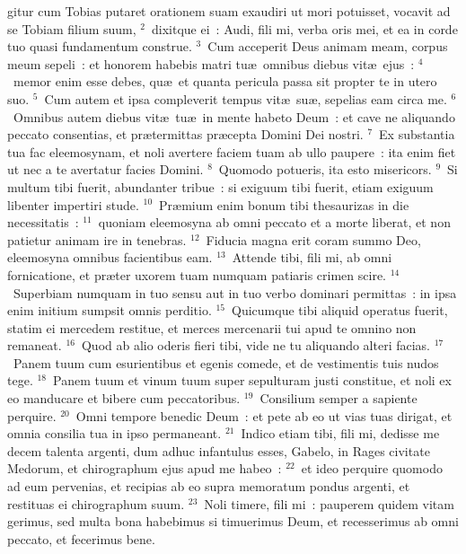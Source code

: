 \bchapter
{}gitur cum Tobias putaret orationem suam exaudiri ut mori potuisset, vocavit ad se Tobiam filium suum,
${}^{2}$~dixitque ei~: Audi, fili mi, verba oris mei, et ea in corde tuo quasi fundamentum construe.
${}^{3}$~Cum acceperit Deus animam meam, corpus meum sepeli~: et honorem habebis matri tu\ae\ omnibus diebus vit\ae\ ejus~:
${}^{4}$~memor enim esse debes, qu\ae\ et quanta pericula passa sit propter te in utero suo.
${}^{5}$~Cum autem et ipsa compleverit tempus vit\ae\ su\ae , sepelias eam circa me.
${}^{6}$~Omnibus autem diebus vit\ae\ tu\ae\ in mente habeto Deum~: et cave ne aliquando peccato consentias, et pr\ae termittas pr\ae cepta Domini Dei nostri.
${}^{7}$~Ex substantia tua fac eleemosynam, et noli avertere faciem tuam ab ullo paupere~: ita enim fiet ut nec a te avertatur facies Domini.
${}^{8}$~Quomodo potueris, ita esto misericors.
${}^{9}$~Si multum tibi fuerit, abundanter tribue~: si exiguum tibi fuerit, etiam exiguum libenter impertiri stude.
${}^{10}$~Pr\ae mium enim bonum tibi thesaurizas in die necessitatis~:
${}^{11}$~quoniam eleemosyna ab omni peccato et a morte liberat, et non patietur animam ire in tenebras.
${}^{12}$~Fiducia magna erit coram summo Deo, eleemosyna omnibus facientibus eam.
${}^{13}$~Attende tibi, fili mi, ab omni fornicatione, et pr\ae ter uxorem tuam numquam patiaris crimen scire.
${}^{14}$~Superbiam numquam in tuo sensu aut in tuo verbo dominari permittas~: in ipsa enim initium sumpsit omnis perditio.
${}^{15}$~Quicumque tibi aliquid operatus fuerit, statim ei mercedem restitue, et merces mercenarii tui apud te omnino non remaneat.
${}^{16}$~Quod ab alio oderis fieri tibi, vide ne tu aliquando alteri facias.
${}^{17}$~Panem tuum cum esurientibus et egenis comede, et de vestimentis tuis nudos tege.
${}^{18}$~Panem tuum et vinum tuum super sepulturam justi constitue, et noli ex eo manducare et bibere cum peccatoribus.
${}^{19}$~Consilium semper a sapiente perquire.
${}^{20}$~Omni tempore benedic Deum~: et pete ab eo ut vias tuas dirigat, et omnia consilia tua in ipso permaneant.
${}^{21}$~Indico etiam tibi, fili mi, dedisse me decem talenta argenti, dum adhuc infantulus esses, Gabelo, in Rages civitate Medorum, et chirographum ejus apud me habeo~:
${}^{22}$~et ideo perquire quomodo ad eum pervenias, et recipias ab eo supra memoratum pondus argenti, et restituas ei chirographum suum.
${}^{23}$~Noli timere, fili mi~: pauperem quidem vitam gerimus, sed multa bona habebimus si timuerimus Deum, et recesserimus ab omni peccato, et fecerimus bene.

